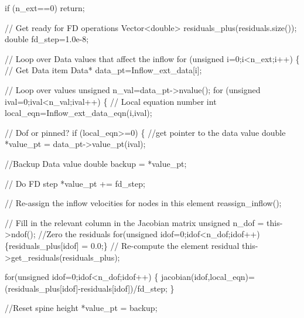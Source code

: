 \begin{DoxyCodeInclude}
   \textcolor{keywordflow}{if} (n\_ext==0) \textcolor{keywordflow}{return};
   
   \textcolor{comment}{// Get ready for FD operations}
   Vector<double> residuals\_plus(residuals.size());
   \textcolor{keywordtype}{double} fd\_step=1.0e-8;

   \textcolor{comment}{// Loop over Data values that affect the inflow}
   \textcolor{keywordflow}{for} (\textcolor{keywordtype}{unsigned} i=0;i<n\_ext;i++)
    \{
     \textcolor{comment}{// Get Data item}
     Data* data\_pt=Inflow\_ext\_data[i];
     
     \textcolor{comment}{// Loop over values}
     \textcolor{keywordtype}{unsigned} n\_val=data\_pt->nvalue();
     \textcolor{keywordflow}{for} (\textcolor{keywordtype}{unsigned} ival=0;ival<n\_val;ival++)
      \{
       \textcolor{comment}{// Local equation number}
       \textcolor{keywordtype}{int} local\_eqn=Inflow\_ext\_data\_eqn(i,ival);
       
       \textcolor{comment}{// Dof or pinned?}
       \textcolor{keywordflow}{if} (local\_eqn>=0)
        \{
         \textcolor{comment}{//get pointer to the data value}
         \textcolor{keywordtype}{double} *value\_pt = data\_pt->value\_pt(ival);

         \textcolor{comment}{//Backup Data value}
         \textcolor{keywordtype}{double} backup = *value\_pt;
         
         \textcolor{comment}{// Do FD step}
         *value\_pt += fd\_step;
         
         \textcolor{comment}{// Re-assign the inflow velocities for nodes in this element}
         reassign\_inflow();
         
                  
         \textcolor{comment}{// Fill in the relevant column in the Jacobian matrix}
         \textcolor{keywordtype}{unsigned} n\_dof = this->ndof();
         \textcolor{comment}{//Zero the residuals}
         \textcolor{keywordflow}{for}(\textcolor{keywordtype}{unsigned} idof=0;idof<n\_dof;idof++) \{residuals\_plus[idof] = 0.0;\}
         \textcolor{comment}{// Re-compute the element residual}
         this->get\_residuals(residuals\_plus);

         \textcolor{keywordflow}{for}(\textcolor{keywordtype}{unsigned} idof=0;idof<n\_dof;idof++)
          \{
           jacobian(idof,local\_eqn)=
            (residuals\_plus[idof]-residuals[idof])/fd\_step;
          \}
         
         \textcolor{comment}{//Reset spine height}
         *value\_pt = backup;
         

\end{DoxyCodeInclude}
